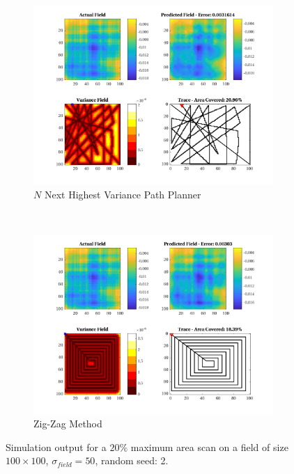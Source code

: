 \begin{figure}[htb!]
\begin{subfigure}[t]{0.5\textwidth}
    \end{subfigure}%
    \\
    \begin{subfigure}[t]{0.5\textwidth}
        \centering
        \includegraphics[width=\linewidth]{figures/hbresults/nnhv_20p_100x100_sf_50_seed_2.png}
        \captionsetup{skip=0.10\baselineskip,size=footnotesize}
        \caption{$N$ Next Highest Variance Path Planner}
    \end{subfigure}%
    ~
    \begin{subfigure}[t]{0.5\textwidth}
        \centering
        \includegraphics[width=\linewidth]{figures/hbresults/zz_20p_100x100_sf_50_seed_2.png}
        \captionsetup{skip=0.10\baselineskip,size=footnotesize}
        \caption{Zig-Zag Method}
    \end{subfigure}%
    \captionsetup{skip=0.20\baselineskip}
    \caption{Simulation output for a $20\%$ maximum area scan on a field of size $100 \times 100$, $\sigma_{field} = 50$, random seed: 2.}
    \label{fig:sim_sigma50_p20_s2}
\end{figure}

